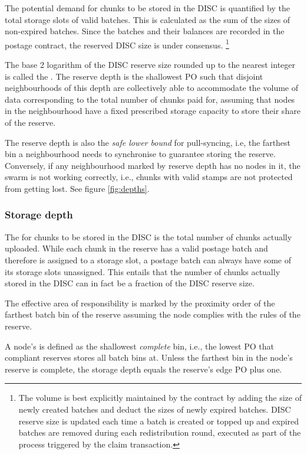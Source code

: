 The potential demand for chunks to be stored in the DISC is quantified by the total storage slots of valid batches. This is calculated as the sum of the sizes of non-expired batches. Since the batches and their balances are recorded in the postage contract, the reserved DISC size is under consensus.%
%
\footnote{The volume is best explicitly maintained by the contract by adding the size of newly created batches and deduct the sizes of newly expired batches. DISC reserve size is updated each time a batch is created or topped up and expired batches are removed during each redistribution round, executed as part of the process triggered by the claim transaction.}  

The base 2 logarithm of the DISC reserve size rounded up to the nearest integer is called the . The reserve depth is the shallowest PO such that disjoint neighbourhoods of this depth are collectively able to accommodate the volume of data corresponding to the total number of chunks paid for, assuming that nodes in the neighbourhood have a fixed prescribed storage capacity to store their share of the reserve. 

The reserve depth is also the \emph{safe lower bound} for pull-syncing, i.e, the farthest bin a neighbourhood needs to synchronise to guarantee storing the reserve.
Conversely, if any neighbourhood marked by reserve depth has no nodes in it, the swarm is not working correctly, i.e., chunks with valid stamps are not protected from getting lost. See figure \ref{fig:depths}.

\subsubsection{Storage depth}

The  for chunks to be stored in the DISC is the total number of chunks actually uploaded. While each chunk in the reserve has a valid postage batch and therefore is assigned to a storage slot, a postage batch can always have some of its storage slots unassigned. This entails that the number of chunks actually stored in the DISC can in fact be a fraction of the DISC reserve size. 

The effective area of responsibility is  marked by the proximity order of the farthest batch bin of the reserve assuming the node complies with the rules of the reserve. 

A node's  is defined as the shallowest \emph{complete} bin, i.e., the lowest PO that compliant reserves stores all batch bins at. Unless the farthest bin in the node's reserve is complete, the storage depth equals the reserve's edge PO plus one.

